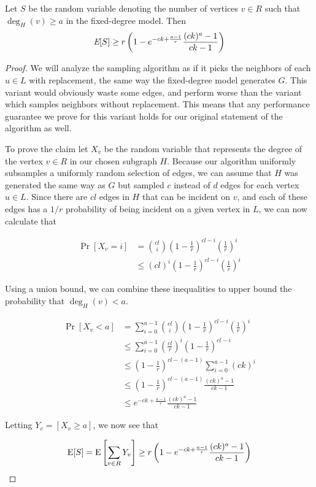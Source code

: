 \begin{thm}\label{original_result}
Let $S$ be the
random variable denoting the number of vertices $v \in R$ such that
$\deg_{H}(v)\geq a$ in the fixed-degree model. Then
\[ \emph{\text{E}}[S] \geq r\left(1-e^{-ck+\frac{a-1}{r}}\frac{(ck)^a-1}{ck-1}\right)  \]
\end{thm}

\begin{proof}
We will analyze the sampling algorithm as if it picks the neighbors of
each $u\in L$ with replacement, the same way the fixed-degree model
generates $G$. This variant would obviously waste some edges, and perform
worse than the variant which samples neighbors without replacement. This
means that any performance guarantee we prove for this variant holds
for our original statement of the algorithm as well. \vs

To prove the claim let $X_{v}$ be the random variable that represents
the degree of the vertex $v\in R$ in our chosen subgraph $H$. Because our
algorithm uniformly subsamples a uniformly random selection of edges,
we can assume that $H$ was generated the same way as $G$ but sampled $c$
instead of $d$ edges for each vertex $u\in L$. Since there are $cl$
edges in $H$ that can be incident on $v$, and each of these edges has a 
$1/r$ probability of being incident on a given vertex in $L$, we can now
calculate that

\begin{align*}
      \Pr[X_v = i]
&=    \binom{cl}{i} (1-\frac{1}{r})^{cl-i} \left(\frac{1}{r}\right)^i \\
&\leq (cl)^i (1-\frac{1}{r})^{cl-i} \left(\frac{1}{r}\right)^i
\end{align*}

Using a union bound, we can combine these inequalities to upper bound
the probability that $\deg_H(v)<a$.

\begin{align*}
      \Pr[X_v < a]
&=    \sum_{i=0}^{a-1} \binom{cl}{i} \left(1-\frac{1}{r}\right)^{cl-i}\left(\frac{1}{r}\right)^i \\
&\leq \sum_{i=0}^{a-1} \left(\frac{cl}{r}\right)^i\left(1-\frac{1}{r}\right)^{cl-i} \\
&\leq    \left(1-\frac{1}{r}\right)^{cl-(a-1)} \sum_{i=0}^{a-1} (ck)^i \\
&\leq \left(1-\frac{1}{r}\right)^{cl-(a-1)}\frac{(ck)^a-1}{ck-1} \\
&\leq e^{-ck+\frac{a-1}{r}} \frac{(ck)^a-1}{ck-1}
\end{align*}

Letting $Y_v = \left[X_v \geq a\right]$, we now see that

\[ \text{E}[S] = \text{E}\left[\sum_{v\in R} Y_v\right] \geq r\left(1-e^{-ck+\frac{a-1}{r}} \frac{(ck)^a-1}{ck-1}\right) \]
\end{proof} \vspace{-.2cm}

